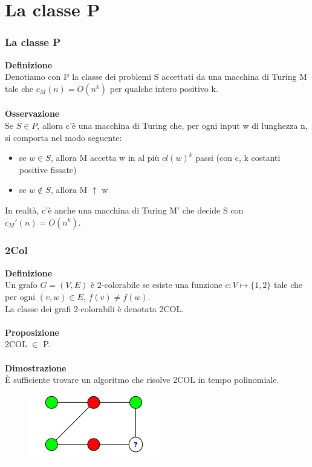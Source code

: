 \chapter{La classe P} \label{ch:capitolo10}
\subsection{La classe P}
\textbf{Definizione}\\
Denotiamo con P la classe dei problemi S accettati da una macchina di Turing M tale che $c_M (n) = O(n^k)$ per qualche intero positivo k.\\\\
\textbf{Osservazione}\\
Se $S \in P$, allora c’è una macchina di Turing che, per ogni input w di lunghezza n, si comporta nel modo seguente:
\begin{itemize}
    \item se $w \in S$, allora M accetta w in al più $cl(w)^k$ passi (con c, k costanti positive fissate)
    
    \item se $w \notin S$, allora M $\uparrow$ w
\end{itemize}
In realtà, c’è anche una macchina di Turing M' che decide S con $c_M'(n) = O(n^k)$.
\subsection{2Col}
\textbf{Definizione}\\
Un grafo $G = (V , E)$ è 2-colorabile se esiste una funzione $c : V \mapsto \{1, 2\}$ tale che per ogni $(v, w) \in E$, $f(v) \neq f (w)$.\\
La classe dei grafi 2-colorabili è denotata 2COL.\\\\
\textbf{Proposizione}\\
2COL $\in$ P.\\\\
\textbf{Dimostrazione}\\
È sufficiente trovare un algoritmo che risolve 2COL in tempo polinomiale.\\
\begin{figure}[htp]
    \centering
    \includegraphics[scale=0.9]{tesi_stile/img/foto1cap10.png}
\end{figure}
